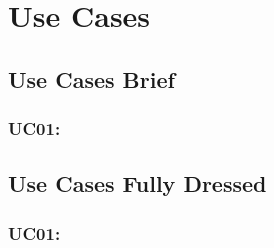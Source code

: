 \section{Use Cases} \label{usecases}

\subsection{Use Cases Brief}
\subsubsection{UC01: }



\subsection{Use Cases Fully Dressed}
\subsubsection{UC01: }

